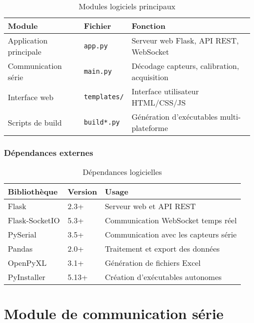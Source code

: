 \documentclass[12pt,a4paper]{article}
\begin{document}
\begin{table}[H]
\centering
\begin{tabular}{|l|l|p{7cm}|}
\hline
\textbf{Module} & \textbf{Fichier} & \textbf{Fonction} \\
\hline
Application principale & \texttt{app.py} & Serveur web Flask, API REST, WebSocket \\
\hline
Communication série & \texttt{main.py} & Décodage capteurs, calibration, acquisition \\
\hline
Interface web & \texttt{templates/} & Interface utilisateur HTML/CSS/JS \\
\hline
Scripts de build & \texttt{build*.py} & Génération d'exécutables multi-plateforme \\
\hline
\end{tabular}
\caption{Modules logiciels principaux}
\label{tab:modules}
\end{table}

\subsubsection{Dépendances externes}

\begin{table}[H]
\centering
\begin{tabular}{|l|l|p{7cm}|}
\hline
\textbf{Bibliothèque} & \textbf{Version} & \textbf{Usage} \\
\hline
Flask & 2.3+ & Serveur web et API REST \\
\hline
Flask-SocketIO & 5.3+ & Communication WebSocket temps réel \\
\hline
PySerial & 3.5+ & Communication avec les capteurs série \\
\hline
Pandas & 2.0+ & Traitement et export des données \\
\hline
OpenPyXL & 3.1+ & Génération de fichiers Excel \\
\hline
PyInstaller & 5.13+ & Création d'exécutables autonomes \\
\hline
\end{tabular}
\caption{Dépendances logicielles}
\label{tab:dependencies}
\end{table}

\section{Module de communication série}
\end{document}
